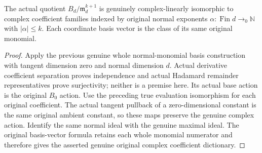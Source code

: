 \begin{theorem}
\label{hir:relative-normal-actual-base-jet-complex-monomial-dictionary}
\leanok
The actual quotient $B_d/\mathfrak m_d^{k+1}$ is genuinely complex-linearly
isomorphic to complex coefficient families indexed by original normal
exponents $\alpha:\operatorname{Fin}d\to_0\mathbb N$ with $|\alpha|\leq k$.
Each coordinate basis vector is the class of its same original monomial.
\end{theorem}
\begin{proof}
Apply the previous genuine whole normal-monomial basis construction with
tangent dimension zero and normal dimension $d$. Actual derivative
coefficient separation proves independence and actual Hadamard remainder
representatives prove surjectivity; neither is a premise here. Its actual
base action is the original $B_0$ action. Use the preceding true evaluation
isomorphism for each original coefficient. The actual tangent pullback
of a zero-dimensional constant is the same original ambient constant,
so these maps preserve the genuine complex action. Identify the same
normal ideal with the genuine maximal ideal. The original basis-vector
formula retains each whole monomial numerator and therefore gives the
asserted genuine original complex coefficient dictionary.
\end{proof}


